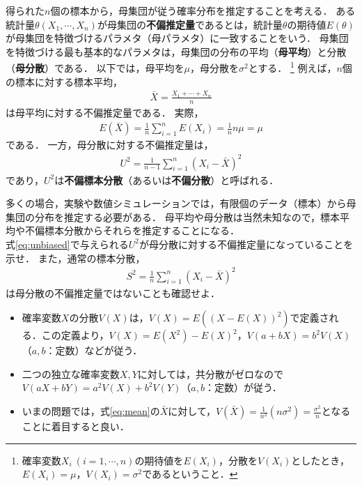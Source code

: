 \documentclass[a4paper,12pt]{jsarticle}
\begin{document}
得られた$n$個の標本から，母集団が従う確率分布を推定することを考える．
ある統計量$\theta(X_{1},\cdots,X_{n})$が母集団の{\bf 不偏推定量}であるとは，統計量$\theta$の期待値$E(\theta)$が母集団を特徴づけるパラメタ（母パラメタ）に一致することをいう．
母集団を特徴づける最も基本的なパラメタは，母集団の分布の平均（{\bf 母平均}）と分散（{\bf 母分散}）である．
以下では，母平均を$\mu$，母分散を$\sigma^{2}$とする．
\footnote{
確率変数$X_{i}~(i=1,\cdots,n)$の期待値を$E(X_{i})$，分散を$V(X_{i})$としたとき，$E(X_{i})=\mu$，$V(X_{i})=\sigma^{2}$であるということ．
}
例えば，$n$個の標本に対する標本平均，
\begin{align}
\label{eq:mean}
    \bar{X}=\frac{X_{1}+\cdots+X_{n}}{n}
\end{align}
は母平均に対する不偏推定量である．
実際，
\begin{align}
    E(\bar{X})
    =
    \frac{1}{n}\sum_{i=1}^{n}E(X_{i})
    =
    \frac{1}{n}n\mu
    =\mu
\end{align}
である．
一方，母分散に対する不偏推定量は，
\begin{align}
\label{eq:unbiased}
    U^{2}
    =
    \frac{1}{n-1}\sum_{i=1}^{n}(X_{i}-\bar{X})^{2}
\end{align}
であり，$U^{2}$は{\bf 不偏標本分散}（あるいは{\bf 不偏分散}）と呼ばれる．

多くの場合，実験や数値シミュレーションでは，有限個のデータ（標本）から母集団の分布を推定する必要がある．
母平均や母分散は当然未知なので，標本平均や不偏標本分散からそれらを推定することになる．\\

式\eqref{eq:unbiased}で与えられる$U^{2}$が母分散に対する不偏推定量になっていることを示せ．
また，通常の標本分散，
\begin{align}
    S^{2}
    =
    \frac{1}{n}\sum_{i=1}^{n}(X_{i}-\bar{X})^{2}
\end{align}
は母分散の不偏推定量ではないことも確認せよ．
\\

\begin{itemize}
    \item 確率変数$X$の分散$V(X)$は，$V(X)=E((X-E(X))^{2})$で定義される．この定義より，$V(X)=E(X^{2})-E(X)^{2}$，$V(a+bX)=b^{2}V(X)$（$a,b$：定数）などが従う．
    \item 二つの独立な確率変数$X,Y$に対しては，共分散がゼロなので$V(aX+bY)=a^{2}V(X)+b^{2}V(Y)$（$a,b$：定数）が従う．
    \item いまの問題では，式\eqref{eq:mean}の$\bar{X}$に対して，$ V(\bar{X})=\frac{1}{n^{2}}(n\sigma^{2})=\frac{\sigma^{2}}{n}$となることに着目すると良い．
\end{itemize}
\end{document}
